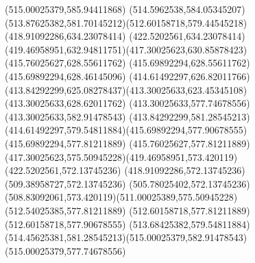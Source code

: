 {{		\lineto(515.00025379,585.94411868)
		\curveto(514.5962538,584.05345207)(513.87625382,581.70145212)(512.60158718,579.44545218)
		\closepath
		\moveto(418.91092286,634.23078414)
		\lineto(422.5202561,634.23078414)
		\curveto(419.46958951,632.94811751)(417.30025623,630.85878423)(415.76025627,628.55611762)
		\lineto(415.69892294,628.55611762)
		\lineto(415.69892294,628.46145096)
		\curveto(414.61492297,626.82011766)(413.84292299,625.08278437)(413.30025633,623.45345108)
		\lineto(413.30025633,628.62011762)
		\closepath
		\moveto(413.30025633,577.74678556)
		\lineto(413.30025633,582.91478543)
		\curveto(413.84292299,581.28545213)(414.61492297,579.54811884)(415.69892294,577.90678555)
		\lineto(415.69892294,577.81211889)
		\lineto(415.76025627,577.81211889)
		\curveto(417.30025623,575.50945228)(419.46958951,573.420119)(422.5202561,572.13745236)
		\lineto(418.91092286,572.13745236)
		\closepath
		\moveto(509.38958727,572.13745236)
		\lineto(505.78025402,572.13745236)
		\curveto(508.83092061,573.420119)(511.00025389,575.50945228)(512.54025385,577.81211889)
		\lineto(512.60158718,577.81211889)
		\lineto(512.60158718,577.90678555)
		\curveto(513.68425382,579.54811884)(514.45625381,581.28545213)(515.00025379,582.91478543)
		\lineto(515.00025379,577.74678556)
		\closepath
	}
}
